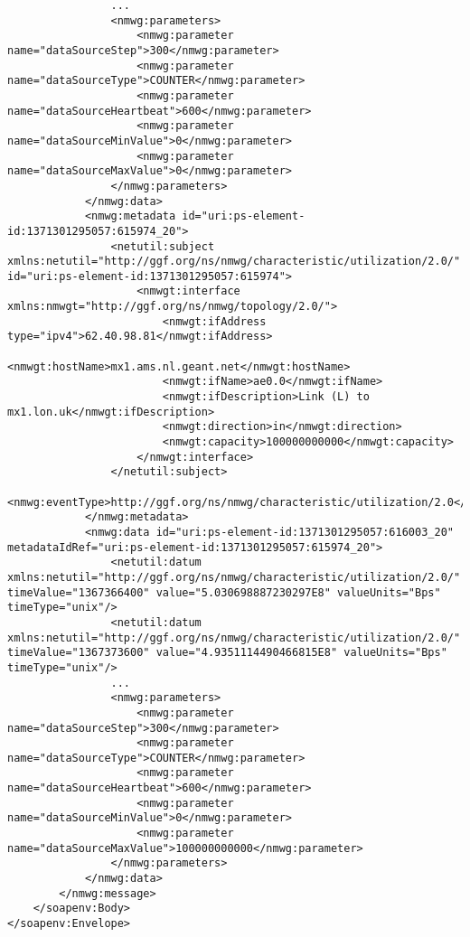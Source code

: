 \documentclass[a4paper,12pt,titlepage,hidelinks,fleqn]{article}
\begin{document}
\begin{flushleft}
\begin{framed}
\begin{lstlisting}
				...
				<nmwg:parameters>
					<nmwg:parameter name="dataSourceStep">300</nmwg:parameter>
					<nmwg:parameter name="dataSourceType">COUNTER</nmwg:parameter>
					<nmwg:parameter name="dataSourceHeartbeat">600</nmwg:parameter>
					<nmwg:parameter name="dataSourceMinValue">0</nmwg:parameter>
					<nmwg:parameter name="dataSourceMaxValue">0</nmwg:parameter>
				</nmwg:parameters>
			</nmwg:data>
			<nmwg:metadata id="uri:ps-element-id:1371301295057:615974_20">
				<netutil:subject xmlns:netutil="http://ggf.org/ns/nmwg/characteristic/utilization/2.0/" id="uri:ps-element-id:1371301295057:615974">
					<nmwgt:interface xmlns:nmwgt="http://ggf.org/ns/nmwg/topology/2.0/">
						<nmwgt:ifAddress type="ipv4">62.40.98.81</nmwgt:ifAddress>
						<nmwgt:hostName>mx1.ams.nl.geant.net</nmwgt:hostName>
						<nmwgt:ifName>ae0.0</nmwgt:ifName>
						<nmwgt:ifDescription>Link (L) to mx1.lon.uk</nmwgt:ifDescription>
						<nmwgt:direction>in</nmwgt:direction>
						<nmwgt:capacity>100000000000</nmwgt:capacity>
					</nmwgt:interface>
				</netutil:subject>
				<nmwg:eventType>http://ggf.org/ns/nmwg/characteristic/utilization/2.0</nmwg:eventType>
			</nmwg:metadata>
			<nmwg:data id="uri:ps-element-id:1371301295057:616003_20" metadataIdRef="uri:ps-element-id:1371301295057:615974_20">
				<netutil:datum xmlns:netutil="http://ggf.org/ns/nmwg/characteristic/utilization/2.0/" timeValue="1367366400" value="5.030698887230297E8" valueUnits="Bps" timeType="unix"/>
				<netutil:datum xmlns:netutil="http://ggf.org/ns/nmwg/characteristic/utilization/2.0/" timeValue="1367373600" value="4.9351114490466815E8" valueUnits="Bps" timeType="unix"/>				
				...				
				<nmwg:parameters>
					<nmwg:parameter name="dataSourceStep">300</nmwg:parameter>
					<nmwg:parameter name="dataSourceType">COUNTER</nmwg:parameter>
					<nmwg:parameter name="dataSourceHeartbeat">600</nmwg:parameter>
					<nmwg:parameter name="dataSourceMinValue">0</nmwg:parameter>
					<nmwg:parameter name="dataSourceMaxValue">100000000000</nmwg:parameter>
				</nmwg:parameters>
			</nmwg:data>
		</nmwg:message>
	</soapenv:Body>
</soapenv:Envelope>
\end{lstlisting}
\end{framed}
\end{flushleft}
\end{document}
